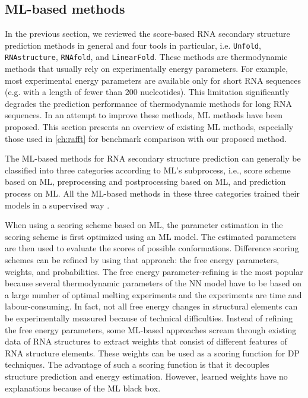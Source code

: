 \subsection{\ac{ML}-based methods}
In the previous section, we reviewed the score-based \ac{RNA} secondary structure prediction methods in general and four tools in particular, i.e. \texttt{Unfold}, \texttt{RNAstructure}, \texttt{RNAfold}, and \texttt{LinearFold}. These methods are thermodynamic methods that usually rely on experimentally energy parameters. For example, most experimental energy parameters are available only for short \ac{RNA} sequences (e.g. with a length of fewer than 200 nucleotides). This limitation significantly degrades the prediction performance of thermodynamic methods for long RNA sequences. In an attempt to improve these methods, \ac{ML} methods have been proposed. This section presents an overview of existing \ac{ML} methods, especially those used in \autoref{ch:rafft} for benchmark comparison with our proposed method.

The \ac{ML}-based methods for \ac{RNA} secondary structure prediction can generally be classified into three categories according to \ac{ML}'s subprocess, i.e., score scheme based on \ac{ML}, preprocessing and postprocessing based on \ac{ML}, and prediction process on \ac{ML}. All the \ac{ML}-based methods in these three categories trained their models in a supervised way \cite{zhao2021review}. 

When using a scoring scheme based on \ac{ML},  the parameter estimation in the scoring scheme is first optimized using an \ac{ML} model. The estimated parameters are then used to evaluate the scores of possible conformations. Difference scoring schemes can be refined by using that approach: the free energy parameters, weights, and probabilities. The free energy parameter-refining is the most popular because several thermodynamic parameters of the \ac{NN} model have to be based on a large number of optimal melting experiments and the experiments are time and labour-consuming. In fact, not all free energy changes in structural elements can be experimentally measured because of technical difficulties. Instead of refining the free energy parameters, some \ac{ML}-based approaches scream through existing data of \ac{RNA} structures to extract weights that consist of different features of \ac{RNA} structure elements. These weights can be used as a scoring function for \ac{DP} techniques. The advantage of such a scoring function is that it decouples structure prediction and energy estimation. However, learned weights have no explanations because of the \ac{ML} black box. 

